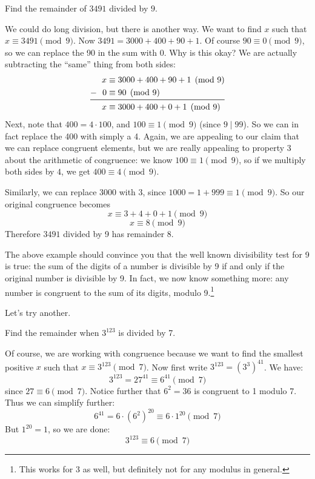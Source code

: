 \documentclass[12pt]{article}
\begin{document}
\begin{example}
  Find the remainder of $3491$ divided by $9$.
  \begin{solution}
  	We could do long division, but there is another way.  We want to find $x$ such that $x \equiv 3491 \pmod{9}$.  Now $3491 = 3000 + 400 + 90 + 1$.  Of course $90 \equiv 0 \pmod 9$, so we can replace the 90 in the sum with 0.  Why is this okay?  We are actually subtracting the ``same'' thing from both sides:
  	\[\begin{aligned}
  	x & \equiv 3000 + 400 + 90 + 1 \pmod 9 \\
  	- ~~ 0 & \equiv 90 \pmod 9 \\ \midrule
  	x & \equiv 3000 + 400 + 0 + 1\pmod 9
  	\end{aligned}\]
  	Next, note that $400 = 4 \cdot 100$, and $100 \equiv 1 \pmod 9$ (since $9 \mid 99$).  So we can in fact replace the 400 with simply a 4.  Again, we are appealing to our claim that we can replace congruent elements, but we are really appealing to property 3 about the arithmetic of congruence: we know $100 \equiv 1 \pmod{9}$, so if we multiply both sides by $4$, we get $400 \equiv 4 \pmod 9$.
  	
  	Similarly, we can replace 3000 with 3, since $1000 = 1 + 999 \equiv 1 \pmod 9$.  So our original congruence becomes
  	\[x \equiv 3 + 4 + 0 + 1 \pmod 9\]
  	\[x \equiv 8 \pmod 9\]
  	Therefore $3491$ divided by 9 has remainder 8.
  \end{solution}
\end{example}

The above example should convince you that the well known divisibility test for 9 is true: the sum of the digits of a number is divisible by 9 if and only if the original number is divisible by 9.  In fact, we now know something more: any number is congruent to the sum of its digits, modulo 9.\footnote{This works for 3 as well, but definitely not for any modulus in general.}

Let's try another.

\begin{example}
	Find the remainder when $3^{123}$ is divided by 7.
	\begin{solution}
		Of course, we are working with congruence because we want to find the smallest positive $x$ such that $x \equiv 3^{123} \pmod 7$.  Now first write $3^{123} = (3^3)^{41}$.  We have:
		\[3^{123} = 27^{41} \equiv 6^{41} \pmod 7\]
		since $27 \equiv 6 \pmod 7$.  Notice further that $6^2 = 36$ is congruent to 1 modulo 7.  Thus we can simplify further:
		\[6^{41} = 6\cdot (6^2)^{20} \equiv 6 \cdot 1^{20} \pmod 7\]
		But $1^{20} = 1$, so we are done:
		\[3^{123} \equiv 6 \pmod 7\]
	\end{solution}
\end{example}
\end{document}
